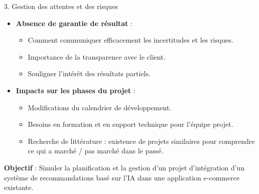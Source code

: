 \begin{frame}{3. Gestion des attentes et des risques}

  \begin{itemize}
  \item \textbf{Absence de garantie de résultat} :
    \begin{itemize}
    \item Comment communiquer efficacement les incertitudes et les risques.
    \item Importance de la transparence avec le client.
    \item Souligner l'intérêt des résultats partiels.
    \end{itemize}
  \item \textbf{Impacts sur les phases du projet} :
    \begin{itemize}
    \item Modifications du calendrier de développement.
    \item Besoins en formation et en support technique pour l'équipe projet.
    \item Recherche de littérature : existence de projets similaires pour comprendre ce qui a marché / pas marché dans le passé.
    \end{itemize}
  \end{itemize}
\end{frame}


\begin{frame}
\textbf{Objectif} : Simuler la planification et la gestion d'un projet
d'intégration d'un système de recommandations basé sur l'IA dans une
application e-commerce existante.
\end{frame}

